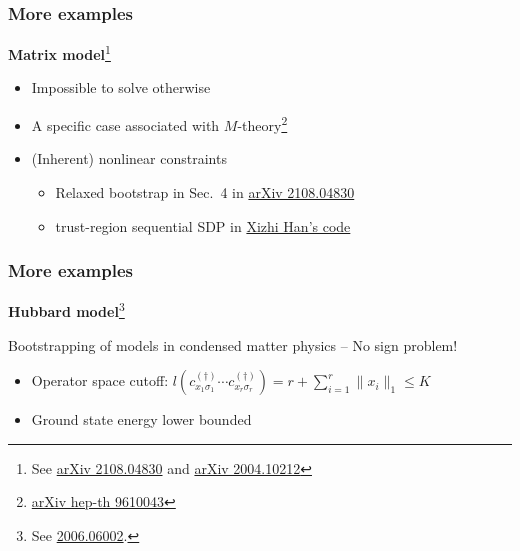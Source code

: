\documentclass{beamer}
\begin{document}
\begin{frame}
\frametitle{More examples}

\textbf{Matrix model}\footnote{See \href{https://arxiv.org/pdf/2108.04830.pdf}{arXiv 2108.04830} and \href{https://arxiv.org/abs/2004.10212}{arXiv 2004.10212}}

\begin{itemize}
    \item Impossible to solve otherwise
    \item A specific case associated with $M$-theory\footnote{\href{https://arxiv.org/abs/hep-th/9610043}{arXiv hep-th 9610043}}
    \item (Inherent) nonlinear constraints
    \begin{itemize}
        \item Relaxed bootstrap in Sec.~4 in \href{https://arxiv.org/pdf/2108.04830.pdf}{arXiv 2108.04830}
        \item trust-region sequential SDP in \href{https://github.com/hanxzh94/matrix-bootstrap}{Xizhi Han's code}
    \end{itemize}
\end{itemize}

\end{frame}

\begin{frame}
\frametitle{More examples}

\textbf{Hubbard model}\footnote{See \href{https://arxiv.org/abs/2006.06002}{2006.06002}.}

Bootstrapping of models in condensed matter physics -- No sign problem!



\begin{itemize}
    \item Operator space cutoff: $l(c_{x_1 \sigma_1}^{(\dagger)} \cdots c_{x_r \sigma_r}^{(\dagger)}) = r + \sum_{i=1}^r \|x_i \|_1 \leq K$ 
    \item Ground state energy lower bounded
\end{itemize}

\end{frame}
\end{document}
